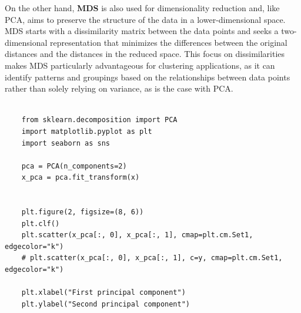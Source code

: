 \documentclass{article}
\begin{document}
On the other hand, \textbf{MDS} is also used for dimensionality reduction and, like PCA, aims to preserve the structure of the data in a lower-dimensional space. MDS starts with a dissimilarity matrix between the data points and seeks a two-dimensional representation that minimizes the differences between the original distances and the distances in the reduced space. This focus on dissimilarities makes MDS particularly advantageous for clustering applications, as it can identify patterns and groupings based on the relationships between data points rather than solely relying on variance, as is the case with PCA.
\begin{lstlisting}[style=mypython, label=fig:pca_code,caption=Application of PCA method]
	
	from sklearn.decomposition import PCA
	import matplotlib.pyplot as plt
	import seaborn as sns
	
	pca = PCA(n_components=2)
	x_pca = pca.fit_transform(x)
	
	
	plt.figure(2, figsize=(8, 6))
	plt.clf()
	plt.scatter(x_pca[:, 0], x_pca[:, 1], cmap=plt.cm.Set1, edgecolor="k")
	# plt.scatter(x_pca[:, 0], x_pca[:, 1], c=y, cmap=plt.cm.Set1, edgecolor="k")
	
	plt.xlabel("First principal component")
	plt.ylabel("Second principal component")	
\end{lstlisting}
\end{document}

